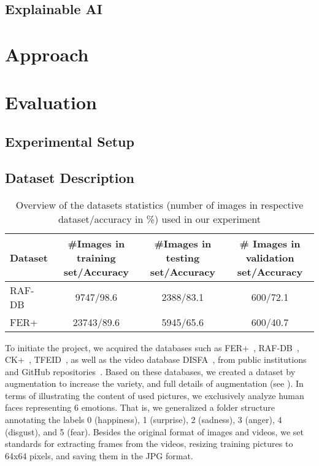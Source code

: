 \subsection{Explainable AI}
\label{sec:related:ai}

\section{Approach}
\label{sec:approach}

\section{Evaluation}
\label{sec:evaluation}

\subsection{Experimental Setup}
\label{sec:evaluation:setup}


\subsection{Dataset Description}
\label{sec:evaluation:datasets}

\begin{table*}[ht]
  \centering
  \begin{tabular}{@{}lccc@{}}
    \toprule
    Dataset & \#Images in training set/Accuracy & \#Images in testing set/Accuracy & \# Images in validation set/Accuracy  \\
    \midrule
    RAF-DB & 9747/98.6 & 2388/83.1 & 600/72.1 \\
    FER+ & 23743/89.6 & 5945/65.6 & 600/40.7  \\
    \bottomrule
  \end{tabular}
  \caption{Overview of the datasets statistics (number of images in respective dataset/accuracy in \%) used in our experiment}
  \label{tab:data}
\end{table*}

To initiate the project, %
we acquired the databases such as FER+~\cite{BarsoumZCZ16}, 
RAF-DB~\cite{li_reliable_2017,li2019reliable}, CK+~\cite{LuceyCKSAM10}, 
TFEID~\cite{tfeid,LiGL22}, 
as well as the video database DISFA~\cite{MavadatiMBTC13}, 
from public institutions and GitHub repositories~\cite{cs229_2023}. 
Based on these databases, we created a dataset by augmentation to increase the variety, 
and full details of augmentation (see ). 
In terms of illustrating the content of used pictures, we exclusively analyze human faces representing 6 emotions. 
That is, 
we generalized a folder structure annotating the labels 0 (happiness), 1 (surprise), 2 (sadness), 3 (anger), 4 (disgust), and 5 (fear). 
Besides the original format of images and videos, we set standards for extracting frames from the videos, 
resizing training pictures to 64x64 pixels, and saving them in the JPG format.

